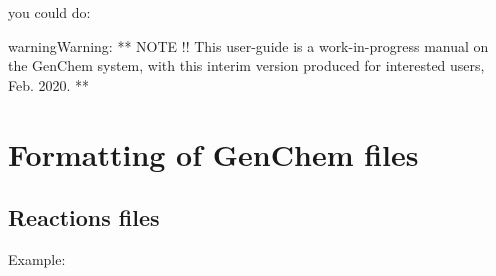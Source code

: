 \documentclass[a4paper,10pt,english]{sphinxmanual}
\begin{document}
you could do:

\begin{sphinxVerbatim}[commandchars=\\\{\}]
    

   
\end{sphinxVerbatim}

\begin{sphinxadmonition}{warning}{Warning:}
**  NOTE !!
This user-guide is a work-in-progress manual on the GenChem system,
with this interim version produced for interested users, Feb. 2020.
**
\end{sphinxadmonition}


\chapter{Formatting of GenChem files}
\label{\detokenize{GenChemDoc_chem:formatting-of-genchem-files}}\label{\detokenize{GenChemDoc_chem::doc}}

\section{Reactions files}
\label{\detokenize{GenChemDoc_chem:reactions-files}}
Example:
\end{document}
